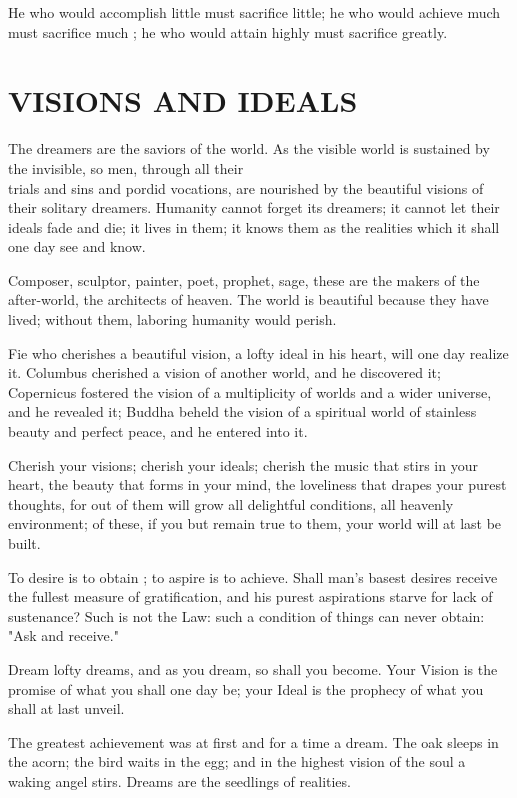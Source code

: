 \documentclass[10pt]{article}
\begin{document}
He who would accomplish little must sacrifice little; he who would achieve much must sacrifice much ; he who would attain highly must sacrifice greatly.

\section*{VISIONS AND IDEALS}
The dreamers are the saviors of the world. As the visible world is sustained by the invisible, so men, through all their\\
trials and sins and pordid vocations, are nourished by the beautiful visions of their solitary dreamers. Humanity cannot forget its dreamers; it cannot let their ideals fade and die; it lives in them; it knows them as the realities which it shall one day see and know.

Composer, sculptor, painter, poet, prophet, sage, these are the makers of the after-world, the architects of heaven. The world is beautiful because they have lived; without them, laboring humanity would perish.

Fie who cherishes a beautiful vision, a lofty ideal in his heart, will one day realize it. Columbus cherished a vision of another world, and he discovered it; Copernicus fostered the vision of a multiplicity of worlds and a wider universe, and he revealed it; Buddha beheld the vision of a spiritual world of stainless beauty and perfect peace, and he entered into it.

Cherish your visions; cherish your ideals; cherish the music that stirs in your heart, the beauty that forms in your mind, the loveliness that drapes your purest thoughts, for out of them will grow all delightful conditions, all heavenly environment; of these, if you but remain true to them, your world will at last be built.

To desire is to obtain ; to aspire is to achieve. Shall man's basest desires receive the fullest measure of gratification, and his purest aspirations starve for lack of sustenance? Such is not the Law: such a condition of things can never obtain: "Ask and receive."

Dream lofty dreams, and as you dream, so shall you become. Your Vision is the promise of what you shall one day be; your Ideal is the prophecy of what you shall at last unveil.

The greatest achievement was at first and for a time a dream. The oak sleeps in the acorn; the bird waits in the egg; and in the highest vision of the soul a waking angel stirs. Dreams are the seedlings of realities.
\end{document}
